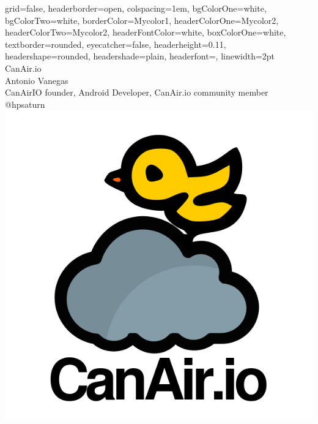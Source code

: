 \documentclass[a0paper,portrait]{baposter}
\begin{document}


\begin{poster}
{
grid=false,
headerborder=open, %
colspacing=1em, %
bgColorOne=white, %
bgColorTwo=white, %
borderColor=Mycolor1, %
headerColorOne=Mycolor2, %
headerColorTwo=Mycolor2, %
headerFontColor=white, %
boxColorOne=white, %
textborder=rounded, %
eyecatcher=false, %
headerheight=0.11\textheight, %
headershape=rounded, %
headershade=plain,
headerfont=\Large\textsf, %
linewidth=2pt %
}
{}
%
%
{
\textsf %
{
{CanAir.io}
}
} %
{\sf\vspace{0.2em}\\
Antonio Vanegas  %
\vspace{0.1em}\\
\small{ CanAirIO founder, Android Developer, CanAir.io community member
\vspace{0.2em}\\
@hpsaturn  %
}
}
{\includegraphics[width=.18\linewidth]{logo.png}} %



\end{poster}
\end{document}
